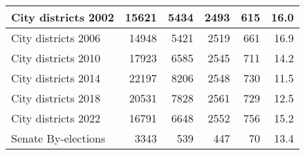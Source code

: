 \begin{tabular}{l|r|r|r|r|r}
\hline
City districts 2002 & 15621 & 5434 & 2493 & 615 & 16.0\\
\hline
City districts 2006 & 14948 & 5421 & 2519 & 661 & 16.9\\
\hline
City districts 2010 & 17923 & 6585 & 2545 & 711 & 14.2\\
\hline
City districts 2014 & 22197 & 8206 & 2548 & 730 & 11.5\\
\hline
City districts 2018 & 20531 & 7828 & 2561 & 729 & 12.5\\
\hline
City districts 2022 & 16791 & 6648 & 2552 & 756 & 15.2\\
\hline
Senate By-elections & 3343 & 539 & 447 & 70 & 13.4\\
\hline
\end{tabular}
